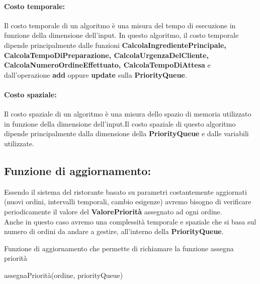 \paragraph{Costo temporale:}
Il costo temporale di un algoritmo è una misura del tempo di esecuzione in funzione della dimensione dell’input. In questo algoritmo, il costo temporale dipende principalmente dalle funzioni \textbf{CalcolaIngredientePrincipale, CalcolaTempoDiPreparazione, CalcolaUrgenzaDelCliente, CalcolaNumeroOrdineEffettuato, CalcolaTempoDiAttesa} e dall’operazione \textbf{add} oppure \textbf{update} sulla \textbf{PriorityQueue}.

\paragraph{Costo spaziale:}
Il costo spaziale di un algoritmo è una misura dello spazio di memoria utilizzato in funzione della dimensione dell’input.Il costo spaziale di questo algoritmo dipende principalmente dalla dimensione della \textbf{PriorityQueue} e dalle variabili utilizzate.

\subsection{Funzione di aggiornamento:}
Essendo il sistema del ristorante basato su parametri costantemente aggiornati (nuovi ordini, intervalli temporali, cambio esigenze) avremo bisogno di verificare periodicamente il valore del \textbf{ValorePriorità} assegnato ad ogni ordine.\\
Anche in questo caso avremo una complessità temporale e spaziale che si basa sul numero di ordini da andare a gestire, all'interno della \textbf{PriorityQueue}.

\begin{algorithm}[h]
	\begin{algorithmic}[h!]
		\caption{Funzione di aggiornamento che permette di richiamare la funzione assegna priorità}
		\State assegnaPriorità(ordine, priorityQueue)
		\EndFor
		\EndProcedure
	\end{algorithmic}
\end{algorithm}

